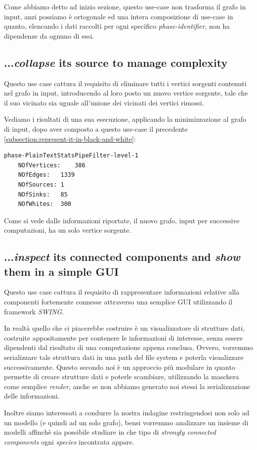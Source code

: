 Come abbiamo detto ad inizio sezione, questo use-case non trasforma il
grafo in input, anzi possiamo \`e ortogonale ed una intera
composizione di use-case in quanto, elencando i dati raccolti per ogni
specifico \emph{phase-identifier}, non ha dipendenze da ognuno di
essi.

\subsection{...\emph{collapse} its source to manage complexity}
Questo use case cattura il requisito di eliminare tutti i vertici
sorgenti contenuti nel grafo in input, introducendo al loro posto un
nuovo vertice sorgente, tale che il suo vicinato sia uguale all'unione
dei vicinati dei vertici rimossi.

Vediamo i risultati di una sua esecuzione, applicando la
minimizzazione al grafo di input, dopo aver composto a questo use-case
il precedente \ref{subsection:represent-it-in-black-and-white}:
\begin{lstlisting}
phase-PlainTextStatsPipeFilter-level-1
	NOfVertices:	386
	NOfEdges:	1339
	NOfSources:	1
	NOfSinks:	85
	NOfWhites:	300
\end{lstlisting}
Come si vede dalle informazioni riportate, il nuovo grafo, input per
successive computazioni, ha un solo vertice sorgente.

\subsection{...\emph{inspect} its connected components and \emph{show}
  them in a simple GUI}
Questo use case cattura il requisito di rappresentare informazioni
relative alla componenti fortemente connesse attraverso una semplice
GUI utilizzando il framework \emph{SWING}.

In realt\`a quello che ci piacerebbe costruire \`e un visualizzatore
di strutture dati, costruite appositamente per contenere le
informazioni di interesse, senza essere dipendenti dal risultato di
una computazione appena conclusa. Ovvero, vorremmo serializzare tale
struttura dati in una path del file system e poterla visualizzare
successivamente. Questo secondo noi \`e un approccio pi\`u modulare in
quanto permette di creare strutture dati e poterle scambiare,
utilizzando la maschera come semplice \emph{render}, anche se non
abbiamo generato noi stessi la serializzazione delle informazioni.

Inoltre siamo interessati a condurre la nostra indagine restringendosi
non solo ad un modello (e quindi ad un solo grafo), bensi vorremmo
analizzare un insieme di modelli affinch\`e sia possibile studiare in
che tipo di \emph{strongly connected components} ogni \emph{species}
incontrata appare.

